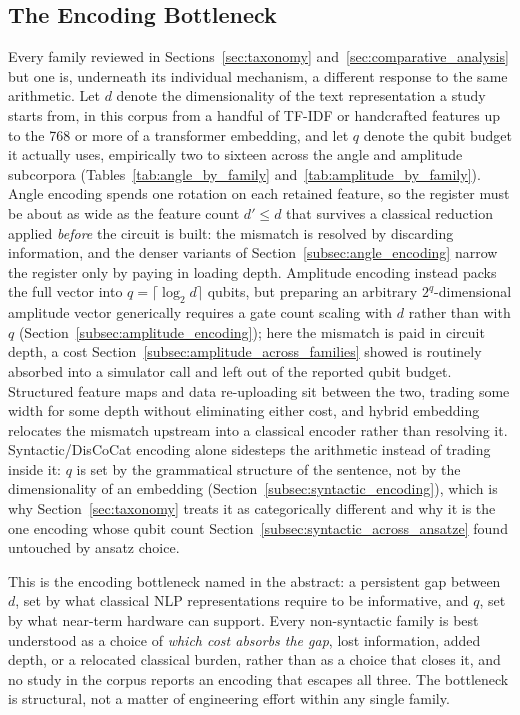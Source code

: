 \documentclass{ieeeaccess}
\begin{document}
\subsection{The Encoding Bottleneck}
\label{subsec:encoding_bottleneck}

Every family reviewed in Sections~\ref{sec:taxonomy} and~\ref{sec:comparative_analysis} but one is, underneath its individual mechanism, a different response to the same arithmetic. Let $d$ denote the dimensionality of the text representation a study starts from, in this corpus from a handful of TF-IDF or handcrafted features up to the 768 or more of a transformer embedding, and let $q$ denote the qubit budget it actually uses, empirically two to sixteen across the angle and amplitude subcorpora (Tables~\ref{tab:angle_by_family} and~\ref{tab:amplitude_by_family}). Angle encoding spends one rotation on each retained feature, so the register must be about as wide as the feature count $d' \leq d$ that survives a classical reduction applied \emph{before} the circuit is built: the mismatch is resolved by discarding information, and the denser variants of Section~\ref{subsec:angle_encoding} narrow the register only by paying in loading depth. Amplitude encoding instead packs the full vector into $q = \lceil \log_2 d \rceil$ qubits, but preparing an arbitrary $2^{q}$-dimensional amplitude vector generically requires a gate count scaling with $d$ rather than with $q$ \cite{mottonen2005transformation,plesch2011quantum} (Section~\ref{subsec:amplitude_encoding}); here the mismatch is paid in circuit depth, a cost Section~\ref{subsec:amplitude_across_families} showed is routinely absorbed into a simulator call and left out of the reported qubit budget. Structured feature maps and data re-uploading sit between the two, trading some width for some depth without eliminating either cost, and hybrid embedding relocates the mismatch upstream into a classical encoder rather than resolving it. Syntactic/DisCoCat encoding alone sidesteps the arithmetic instead of trading inside it: $q$ is set by the grammatical structure of the sentence, not by the dimensionality of an embedding (Section~\ref{subsec:syntactic_encoding}), which is why Section~\ref{sec:taxonomy} treats it as categorically different and why it is the one encoding whose qubit count Section~\ref{subsec:syntactic_across_ansatze} found untouched by ansatz choice.

This is the encoding bottleneck named in the abstract: a persistent gap between $d$, set by what classical NLP representations require to be informative, and $q$, set by what near-term hardware can support. Every non-syntactic family is best understood as a choice of \emph{which cost absorbs the gap}, lost information, added depth, or a relocated classical burden, rather than as a choice that closes it, and no study in the corpus reports an encoding that escapes all three. The bottleneck is structural, not a matter of engineering effort within any single family.
\end{document}
